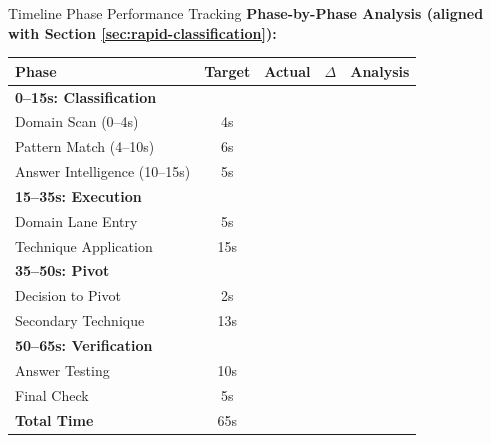 \documentclass{article}
\begin{document}
\begin{analysisbox}{Timeline Phase Performance Tracking}
\textbf{Phase-by-Phase Analysis (aligned with Section \ref{sec:rapid-classification}):}
\begin{center}
\begin{tabular}{|l|c|c|c|l|}
\hline
\textbf{Phase} & \textbf{Target} & \textbf{Actual} & \textbf{$\Delta$} & \textbf{Analysis} \\
\hline
\textbf{0--15s: Classification} & & & & \\
\quad Domain Scan (0--4s) & 4s & & & \\
\quad Pattern Match (4--10s) & 6s & & & \\
\quad Answer Intelligence (10--15s) & 5s & & & \\
\hline
\textbf{15--35s: Execution} & & & & \\
\quad Domain Lane Entry & 5s & & & \\
\quad Technique Application & 15s & & & \\
\hline
\textbf{35--50s: Pivot} & & & & \\
\quad Decision to Pivot & 2s & & & \\
\quad Secondary Technique & 13s & & & \\
\hline
\textbf{50--65s: Verification} & & & & \\
\quad Answer Testing & 10s & & & \\
\quad Final Check & 5s & & & \\
\hline
\textbf{Total Time} & 65s & & & \\
\hline
\end{tabular}
\end{center}


\end{analysisbox}
\end{document}
